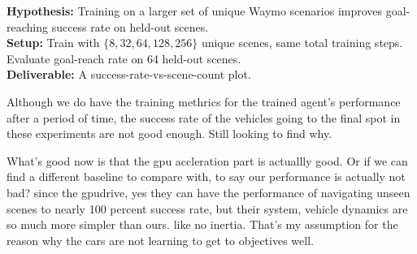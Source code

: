 \begin{chatbox}
\textbf{Hypothesis:} Training on a larger set of unique Waymo scenarios improves goal-reaching success rate on held-out scenes.\\
\textbf{Setup:} Train with $\{8, 32, 64, 128, 256\}$ unique scenes, same total training steps.  Evaluate goal-reach rate on 64 held-out scenes.\\
\textbf{Deliverable:} A success-rate-vs-scene-count plot.
\end{chatbox}

Although we do have the training methrics for the trained agent's performance after a period of time, the success rate of the vehicles going to the final spot in these experiments are not good enough. Still looking to find why.
%

What's good now is that the gpu accleration part is actuallly good. Or if we can find a different baseline to compare with, to say our performance is actually not bad? since the gpudrive, yes they can have the performance of navigating unseen scenes to nearly 100 percent  success rate, but their system, vehicle dynamics are so much more simpler than ours. like no inertia. That's my assumption for the reason why the cars are not learning to get to objectives well.
%

